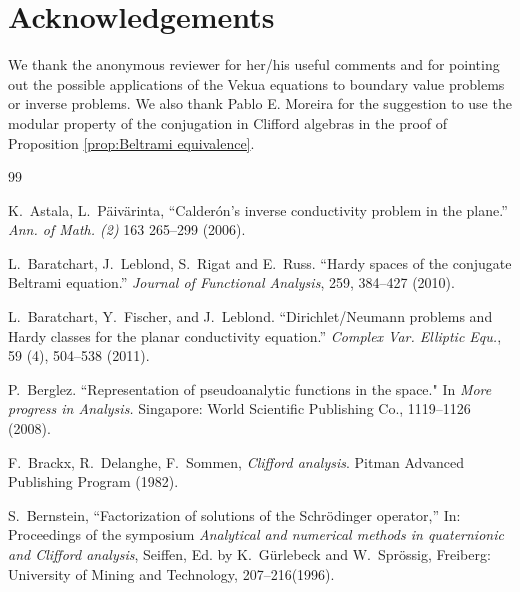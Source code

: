 \documentclass[12pt]{article}
\begin{document}
\section*{Acknowledgements}
We thank the anonymous reviewer for her/his useful comments and for pointing out the possible applications of the Vekua equations to boundary value problems or inverse problems. 
We also thank Pablo E. Moreira for the suggestion to use the modular property of the conjugation in Clifford algebras in the proof of Proposition \ref{prop:Beltrami equivalence}.
\begin{thebibliography}{99}

K.~Astala, L.~P\"{a}iv\"{a}rinta, ``Calder\'{o}n's  inverse conductivity problem in the plane.''  {\em Ann. of Math. (2)} 163 265--299 (2006).



L.~Baratchart, J.~Leblond, S.~Rigat and E.~Russ. ``Hardy spaces of the conjugate Beltrami equation.''
{\em Journal of Functional Analysis}, 259, 384--427 (2010).

L.~Baratchart, Y.~Fischer, and J.~Leblond. ``Dirichlet/Neumann problems and Hardy classes for the planar conductivity equation.''
{\em Complex Var. Elliptic Equ.}, 59 (4), 504--538 (2011).

P.~Berglez. ``Representation of pseudoanalytic functions in the space." In {\em More progress in Analysis.} Singapore: World Scientific Publishing Co., 1119--1126 (2008).

F.~Brackx, R.~Delanghe, F.~Sommen, {\em Clifford analysis}. Pitman Advanced Publishing Program (1982).

	
 S.~Bernstein, ``Factorization of solutions of the Schr\"{odinger operator},'' In: Proceedings of the symposium
{\em Analytical and numerical methods in quaternionic and Clifford analysis}, Seiffen, Ed. by K.~G\"{u}rlebeck and W.~Spr\"{o}ssig, Freiberg: University of Mining and Technology, 207--216(1996).


\end{thebibliography}
\end{document}
